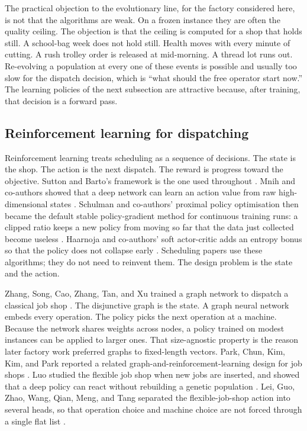 The practical objection to the evolutionary line, for the factory considered here, is not that the algorithms are weak. On a frozen instance they are often the quality ceiling. The objection is that the ceiling is computed for a shop that holds still. A school-bag week does not hold still. Health moves with every minute of cutting. A rush trolley order is released at mid-morning. A thread lot runs out. Re-evolving a population at every one of these events is possible and usually too slow for the dispatch decision, which is ``what should the free operator start now.'' The learning policies of the next subsection are attractive because, after training, that decision is a forward pass.

\subsection{Reinforcement learning for dispatching}

Reinforcement learning treats scheduling as a sequence of decisions. The state is the shop. The action is the next dispatch. The reward is progress toward the objective. Sutton and Barto's framework is the one used throughout \cite{sutton2018}. Mnih and co-authors showed that a deep network can learn an action value from raw high-dimensional states \cite{mnih2015}. Schulman and co-authors' proximal policy optimisation then became the default stable policy-gradient method for continuous training runs: a clipped ratio keeps a new policy from moving so far that the data just collected become useless \cite{schulman2017}. Haarnoja and co-authors' soft actor-critic adds an entropy bonus so that the policy does not collapse early \cite{haarnoja2018}. Scheduling papers use these algorithms; they do not need to reinvent them. The design problem is the state and the action.

Zhang, Song, Cao, Zhang, Tan, and Xu trained a graph network to dispatch a classical job shop \cite{zhang2020}. The disjunctive graph is the state. A graph neural network embeds every operation. The policy picks the next operation at a machine. Because the network shares weights across nodes, a policy trained on modest instances can be applied to larger ones. That size-agnostic property is the reason later factory work preferred graphs to fixed-length vectors. Park, Chun, Kim, Kim, and Park reported a related graph-and-reinforcement-learning design for job shops \cite{park2021}. Luo studied the flexible job shop when new jobs are inserted, and showed that a deep policy can react without rebuilding a genetic population \cite{luo2020}. Lei, Guo, Zhao, Wang, Qian, Meng, and Tang separated the flexible-job-shop action into several heads, so that operation choice and machine choice are not forced through a single flat list \cite{lei2022}.

